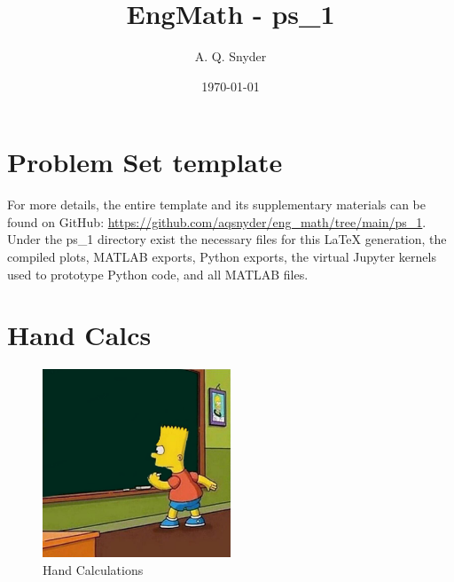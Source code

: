 \documentclass{article}
\begin{document}
\title{EngMath - ps\_1}
\author{A. Q. Snyder}
\date{\today}

\maketitle

\section{Problem Set template}

For more details, the entire template and its supplementary materials can be found on GitHub: \href{https://github.com/aqsnyder/eng_math/tree/main/ps_1}{https://github.com/aqsnyder/eng_math/tree/main/ps_1}.
Under the ps\_1 directory exist the necessary files for this LaTeX generation, the compiled plots, MATLAB exports, Python exports, the virtual Jupyter kernels used to prototype Python code, and all MATLAB files.



\section{Hand Calcs}
\begin{figure}[htbp]
    \centering
    \includegraphics[width=0.5\textwidth]{misc_media/hand-calcs.jpg}
    \caption{Hand Calculations}
    \label{fig:hand-calcs}
\end{figure}

\vspace{2cm}  %

 
 
 
 
\end{document}
